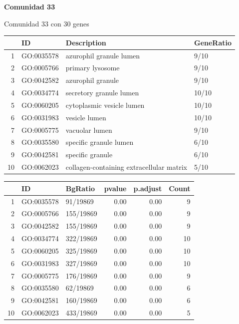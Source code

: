 \textbf{Comunidad 33}

Comunidad 33 con 30 genes

\hfill

\begin{table}[ht]
\centering
\begin{tabular}{rlll}
  \hline
 & ID & Description & GeneRatio \\ 
  \hline
1 & GO:0035578 & azurophil granule lumen & 9/10 \\ 
  2 & GO:0005766 & primary lysosome & 9/10 \\ 
  3 & GO:0042582 & azurophil granule & 9/10 \\ 
  4 & GO:0034774 & secretory granule lumen & 10/10 \\ 
  5 & GO:0060205 & cytoplasmic vesicle lumen & 10/10 \\ 
  6 & GO:0031983 & vesicle lumen & 10/10 \\ 
  7 & GO:0005775 & vacuolar lumen & 9/10 \\ 
  8 & GO:0035580 & specific granule lumen & 6/10 \\ 
  9 & GO:0042581 & specific granule & 6/10 \\ 
  10 & GO:0062023 & collagen-containing extracellular matrix & 5/10 \\ 
   \hline
\end{tabular}
\end{table}

\begin{table}[ht]
\centering
\begin{tabular}{rllrrr}
  \hline
 & ID & BgRatio & pvalue & p.adjust & Count \\ 
  \hline
1 & GO:0035578 & 91/19869 & 0.00 & 0.00 &   9 \\ 
  2 & GO:0005766 & 155/19869 & 0.00 & 0.00 &   9 \\ 
  3 & GO:0042582 & 155/19869 & 0.00 & 0.00 &   9 \\ 
  4 & GO:0034774 & 322/19869 & 0.00 & 0.00 &  10 \\ 
  5 & GO:0060205 & 325/19869 & 0.00 & 0.00 &  10 \\ 
  6 & GO:0031983 & 327/19869 & 0.00 & 0.00 &  10 \\ 
  7 & GO:0005775 & 176/19869 & 0.00 & 0.00 &   9 \\ 
  8 & GO:0035580 & 62/19869 & 0.00 & 0.00 &   6 \\ 
  9 & GO:0042581 & 160/19869 & 0.00 & 0.00 &   6 \\ 
  10 & GO:0062023 & 433/19869 & 0.00 & 0.00 &   5 \\ 
   \hline
\end{tabular}
\end{table}

